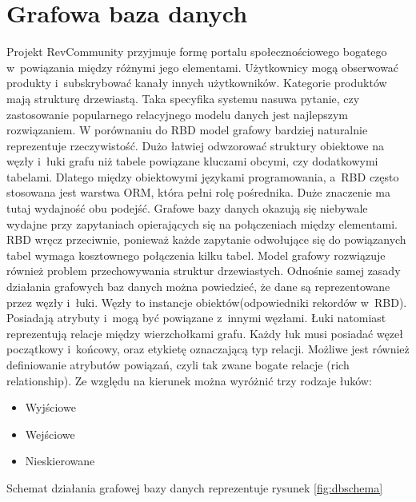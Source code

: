\section{Grafowa baza danych}

Projekt RevCommunity przyjmuje formę portalu społecznościowego bogatego w~powiązania między różnymi jego elementami. Użytkownicy mogą obserwować produkty i~subskrybować kanały innych użytkowników. Kategorie produktów mają strukturę drzewiastą. Taka specyfika systemu nasuwa pytanie, czy zastosowanie popularnego relacyjnego modelu danych jest najlepszym rozwiązaniem. W porównaniu do RBD model grafowy bardziej naturalnie reprezentuje rzeczywistość. Dużo łatwiej odwzorować struktury obiektowe na węzły i~łuki grafu niż tabele powiązane kluczami obcymi, czy dodatkowymi tabelami. Dlatego między obiektowymi językami programowania, a~RBD często stosowana jest warstwa ORM, która pełni rolę pośrednika. Duże znaczenie ma tutaj wydajność obu podejść. Grafowe bazy danych okazują się niebywale wydajne przy zapytaniach opierających się na połączeniach między elementami. RBD wręcz przeciwnie, ponieważ każde zapytanie odwołujące się do powiązanych tabel wymaga kosztownego połączenia kilku tabel. Model grafowy rozwiązuje również problem przechowywania struktur drzewiastych.
Odnośnie samej zasady działania grafowych baz danych można powiedzieć, że dane są reprezentowane przez węzły i~łuki. Węzły to instancje obiektów(odpowiedniki rekordów w~RBD). Posiadają atrybuty i~mogą być powiązane z~innymi węzłami. Łuki natomiast reprezentują relacje między wierzchołkami grafu. Każdy łuk musi posiadać węzeł początkowy i~końcowy, oraz etykietę oznaczającą typ relacji. Możliwe jest również definiowanie atrybutów powiązań, czyli tak zwane bogate relacje (rich relationship). Ze względu na kierunek można wyróżnić trzy rodzaje łuków:

\begin{itemize}
\item Wyjściowe
\item Wejściowe
\item Nieskierowane
\end{itemize}

\noindent
Schemat działania grafowej bazy danych reprezentuje rysunek \ref{fig:dbschema}

